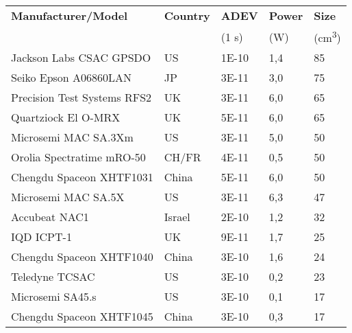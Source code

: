 \begin{table}
    \centering
    \begin{tabular}{l|llll}
        \hline
        \textbf{Manufacturer/Model} & \textbf{Country} & \textbf{ADEV} & \textbf{Power} & \textbf{Size}           \\
        ~                           & ~                & (1 s)         & (W)            & (cm\textsuperscript{3}) \\
        \hline
        Jackson Labs CSAC GPSDO     & US               & 1E-10         & 1,4            & 85                      \\
        Seiko Epson A06860LAN       & JP               & 3E-11         & 3,0            & 75                      \\
        Precision Test Systems RFS2 & UK               & 3E-11         & 6,0            & 65                      \\
        Quartziock El O-MRX         & UK               & 5E-11         & 6,0            & 65                      \\
        Microsemi MAC SA.3Xm        & US               & 3E-11         & 5,0            & 50                      \\
        Orolia Spectratime mRO-50   & CH/FR            & 4E-11         & 0,5            & 50                      \\
        Chengdu Spaceon XHTF1031    & China            & 5E-11         & 6,0            & 50                      \\
        Microsemi MAC SA.5X         & US               & 3E-11         & 6,3            & 47                      \\
        Accubeat NAC1               & Israel           & 2E-10         & 1,2            & 32                      \\
        IQD ICPT-1                  & UK               & 9E-11         & 1,7            & 25                      \\
        Chengdu Spaceon XHTF1040    & China            & 3E-10         & 1,6            & 24                      \\
        Teledyne TCSAC              & US               & 3E-10         & 0,2            & 23                      \\
        Microsemi SA45.s            & US               & 3E-10         & 0,1            & 17                      \\
        Chengdu Spaceon XHTF1045    & China            & 3E-10         & 0,3            & 17                      \\
        \hline
    \end{tabular}
\end{table}